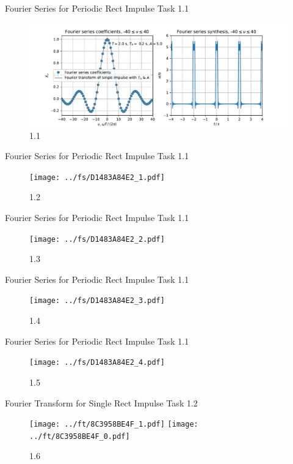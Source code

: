 \documentclass[mathserif, aspectratio=43]{intbeamer}
\begin{document}
\begin{frame}{Fourier Series for Periodic Rect Impulse}
Task 1.1
\begin{figure}
\includegraphics[width=\textwidth]{../fs/D1483A84E2_0.pdf}
\caption{1.1}
\end{figure}
\end{frame}

\begin{frame}{Fourier Series for Periodic Rect Impulse}
Task 1.1
\begin{figure}
\texttt{[image: ../fs/D1483A84E2\_1.pdf]}
\caption{1.2}
\end{figure}
\end{frame}

\begin{frame}{Fourier Series for Periodic Rect Impulse}
Task 1.1
\begin{figure}
\texttt{[image: ../fs/D1483A84E2\_2.pdf]}
\caption{1.3}
\end{figure}
\end{frame}

\begin{frame}{Fourier Series for Periodic Rect Impulse}
Task 1.1
\begin{figure}
\texttt{[image: ../fs/D1483A84E2\_3.pdf]}
\caption{1.4}
\end{figure}
\end{frame}

\begin{frame}{Fourier Series for Periodic Rect Impulse}
Task 1.1
\begin{figure}
\texttt{[image: ../fs/D1483A84E2\_4.pdf]}
\caption{1.5}
\end{figure}
\end{frame}


\begin{frame}{Fourier Transform for Single Rect Impulse}
Task 1.2
\begin{figure}
\texttt{[image: ../ft/8C3958BE4F\_1.pdf]}
\texttt{[image: ../ft/8C3958BE4F\_0.pdf]}
\caption{1.6}
\end{figure}
\end{frame}
\end{document}

